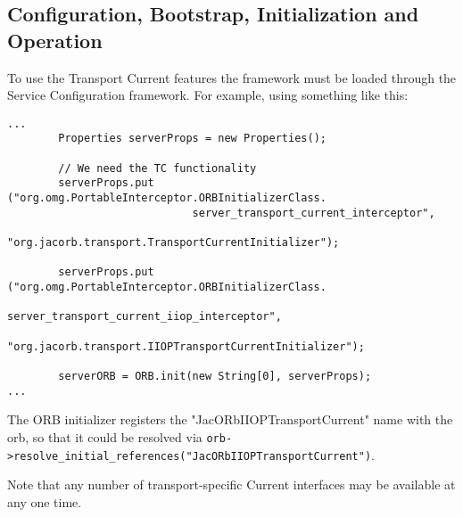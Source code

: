 \subsection{Configuration, Bootstrap, Initialization and Operation}


To use the Transport Current features the framework must be loaded
through the Service Configuration framework. For example, using something
like this:

\begin{verbatim}
...
        Properties serverProps = new Properties();

        // We need the TC functionality
        serverProps.put ("org.omg.PortableInterceptor.ORBInitializerClass.
                             server_transport_current_interceptor",
                         "org.jacorb.transport.TransportCurrentInitializer");

        serverProps.put ("org.omg.PortableInterceptor.ORBInitializerClass.
                             server_transport_current_iiop_interceptor",
                        "org.jacorb.transport.IIOPTransportCurrentInitializer");

        serverORB = ORB.init(new String[0], serverProps);
...
\end{verbatim}

The ORB initializer registers the "JacORbIIOPTransportCurrent" name with the orb,
so that it could be resolved via {\tt orb->resolve\_initial\_references("JacORbIIOPTransportCurrent")}.

Note that any number of transport-specific Current interfaces may be available at any one time.
